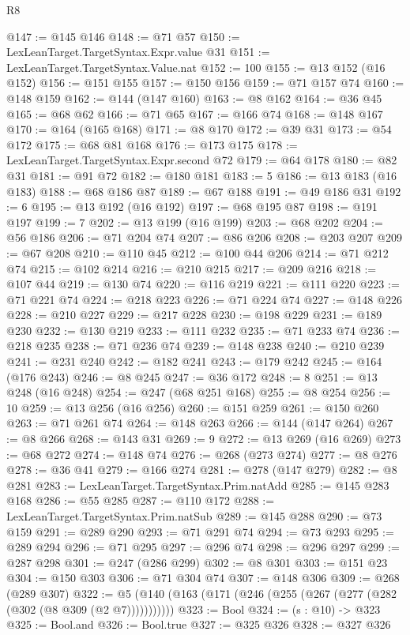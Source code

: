\begin{lexlean}{R8}
\begin{coremodule}
@147 := @145 @146
@148 := @71 @57
@150 := LexLeanTarget.TargetSyntax.Expr.value @31
@151 := LexLeanTarget.TargetSyntax.Value.nat
@152 := 100
@155 := @13 @152 (@16 @152)
@156 := @151 @155
@157 := @150 @156
@159 := @71 @157 @74
@160 := @148 @159
@162 := @144 (@147 @160)
@163 := @8 @162
@164 := @36 @45
@165 := @68 @62
@166 := @71 @65
@167 := @166 @74
@168 := @148 @167
@170 := @164 (@165 @168)
@171 := @8 @170
@172 := @39 @31
@173 := @54 @172
@175 := @68 @81 @168
@176 := @173 @175
@178 := LexLeanTarget.TargetSyntax.Expr.second @72
@179 := @64 @178
@180 := @82 @31
@181 := @91 @72
@182 := @180 @181
@183 := 5
@186 := @13 @183 (@16 @183)
@188 := @68 @186 @87
@189 := @67 @188
@191 := @49 @186 @31
@192 := 6
@195 := @13 @192 (@16 @192)
@197 := @68 @195 @87
@198 := @191 @197
@199 := 7
@202 := @13 @199 (@16 @199)
@203 := @68 @202
@204 := @56 @186
@206 := @71 @204 @74
@207 := @86 @206
@208 := @203 @207
@209 := @67 @208
@210 := @110 @45
@212 := @100 @44 @206
@214 := @71 @212 @74
@215 := @102 @214
@216 := @210 @215
@217 := @209 @216
@218 := @107 @44
@219 := @130 @74
@220 := @116 @219
@221 := @111 @220
@223 := @71 @221 @74
@224 := @218 @223
@226 := @71 @224 @74
@227 := @148 @226
@228 := @210 @227
@229 := @217 @228
@230 := @198 @229
@231 := @189 @230
@232 := @130 @219
@233 := @111 @232
@235 := @71 @233 @74
@236 := @218 @235
@238 := @71 @236 @74
@239 := @148 @238
@240 := @210 @239
@241 := @231 @240
@242 := @182 @241
@243 := @179 @242
@245 := @164 (@176 @243)
@246 := @8 @245
@247 := @36 @172
@248 := 8
@251 := @13 @248 (@16 @248)
@254 := @247 (@68 @251 @168)
@255 := @8 @254
@256 := 10
@259 := @13 @256 (@16 @256)
@260 := @151 @259
@261 := @150 @260
@263 := @71 @261 @74
@264 := @148 @263
@266 := @144 (@147 @264)
@267 := @8 @266
@268 := @143 @31
@269 := 9
@272 := @13 @269 (@16 @269)
@273 := @68 @272
@274 := @148 @74
@276 := @268 (@273 @274)
@277 := @8 @276
@278 := @36 @41
@279 := @166 @274
@281 := @278 (@147 @279)
@282 := @8 @281
@283 := LexLeanTarget.TargetSyntax.Prim.natAdd
@285 := @145 @283 @168
@286 := @55 @285
@287 := @110 @172
@288 := LexLeanTarget.TargetSyntax.Prim.natSub
@289 := @145 @288
@290 := @73 @159
@291 := @289 @290
@293 := @71 @291 @74
@294 := @73 @293
@295 := @289 @294
@296 := @71 @295
@297 := @296 @74
@298 := @296 @297
@299 := @287 @298
@301 := @247 (@286 @299)
@302 := @8 @301
@303 := @151 @23
@304 := @150 @303
@306 := @71 @304 @74
@307 := @148 @306
@309 := @268 (@289 @307)
@322 := @5 (@140 (@163 (@171 (@246 (@255 (@267 (@277 (@282 (@302 (@8 @309 (@2 @7)))))))))))
@323 := Bool
@324 := (s : @10) -> @323
@325 := Bool.and
@326 := Bool.true
@327 := @325 @326
@328 := @327 @326

\end{coremodule}
\end{lexlean}
